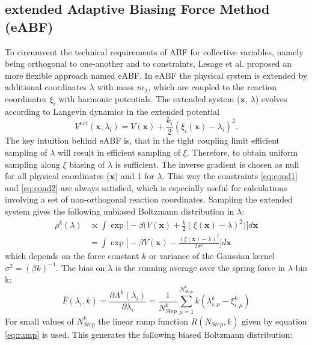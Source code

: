 \subsection{extended Adaptive Biasing Force Method (eABF)}
\label{sec:eABF}
To circumvent the technical requirements of ABF for collective variables, namely being orthogonal to one-another and to constraints, Lesage et al.\autocite{lesage2017smoothed} proposed an more flexible approach named eABF.
In eABF the physical system is extended by additional coordinates $\lambda$ with mass $m_{\lambda}$, which are coupled to the reaction coordinates $\xi_i$ with harmonic potentials. The extended system ($\textbf{x}$, $\lambda$) evolves according to Langevin dynamics in the extended potential
\begin{equation}
  V^{ext}(\textbf{x},\lambda_i) = V(\textbf{x}) + \frac{k_i}{2}(\xi_{i}(\textbf{x})-\lambda_i)^2.
\end{equation}
The key intuition behind eABF is, that in the tight coupling limit efficient sampling of $\lambda$ will result in efficient sampling of $\xi$. Therefore, to obtain uniform sampling along $\xi$ biasing of $\lambda$ is sufficient. The inverse gradient is chosen as null for all physical coordinates ($\textbf{x}$) and 1 for $\lambda$. This way the constraints \ref{eq:cond1} and \ref{eq:cond2} are always satisfied, which is especially useful for calculations involving a set of non-orthogonal reaction coordinates.
Sampling the extended system gives the following unbiased Boltzmann distribution in $\lambda$:
\begin{equation}
\begin{aligned}
  \rho^k(\lambda) &\propto
  \int \exp \biggl[-\beta \biggl(V(\textbf{x})+\frac{k}{2}(\xi(\textbf{x})-\lambda)^2 \biggr) \biggr] d\textbf{x} \\
  &= \int \exp \biggl[-\beta V(\textbf{x}) - \frac{(\xi(\textbf{x})-\lambda)^2}{2\sigma^2} \biggr] d\textbf{x}
\end{aligned}
\end{equation}
which depends on the force constant $k$ or variance of the Gaussian kernel $\sigma^2=(\beta k)^{-1}$.
The bias on $\lambda$ is the running average over the spring force in $\lambda$-bin k:
\begin{equation}
  \overline{F}(\lambda_{i}, k) = \frac{\partial A^{k}(\lambda_{i})}{\partial \lambda_i} = \frac{1}{N_{Step}^{k}} \sum_{\mu=1}^{N_{Step}^{k}} k(\lambda_{i,\mu}^{k}-\xi_{i,\mu}^{k})
\end{equation}
For small values of $N_{Step}^{k}$ the linear ramp function $R(N_{Step},k)$ given by equation \ref{eq:ramp} is used. This generates the following biased Boltzmann distribution:
